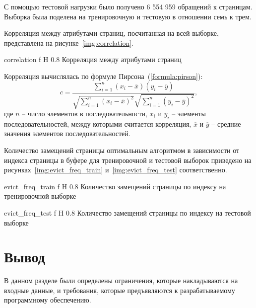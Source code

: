 С помощью тестовой нагрузки было получено 6 554 959 обращений к страницам.
Выборка была поделена на тренировочную и тестовую в отношении семь к трем.

Корреляция между атрибутами страниц, посчитанная на всей выборке, представлена на рисунке~\ref{img:correlation}.

{correlation} %
{f} %
{H} %
{0.8\textwidth} %
{Корреляция между атрибутами страниц} %

Корреляция вычислялась по формуле Пирсона~(\ref{formula:pirson}):
\begin{equation}\label{formula:pirson}
	c = \frac{\sum\limits_{i=1}^{n} (x_i - \overline{x}) (y_i - \overline{y})}{\sqrt{\sum\limits_{i=1}^{n}(x_i - \overline{x})^2} \sqrt{\sum\limits_{i=1}^{n}(y_i - \overline{y})^2}},
\end{equation}
где $n$ -- число элементов в последовательности, $x_i$ и $y_i$ -- элементы последовательностей, между которыми считается корреляция, $\overline{x}$ и $\overline{y}$ -- средние значения элементов последовательностей.

Количество замещений страницы оптимальным алгоритмом в зависимости от индекса страницы в буфере для тренировочной и тестовой выборок приведено на рисунках~\ref{img:evict_freq_train} и~\ref{img:evict_freq_test} соответственно.

{evict_freq_train} %
{f} %
{H} %
{0.8\textwidth} %
{Количество замещений страницы по индексу на тренировочной выборке} %

{evict_freq_test} %
{f} %
{H} %
{0.8\textwidth} %
{Количество замещений страницы по индексу на тестовой выборке} %


\section{Вывод}

В данном разделе были определены ограничения, которые накладываются на входные данные, и требования, которые предъявляются к разрабатываемому программному обеспечению.

